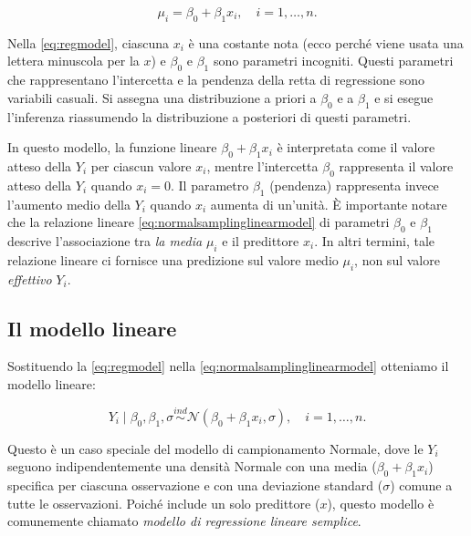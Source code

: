 \documentclass[
  11pt,
]{krantz}
\theoremstyle{definition}
\theoremstyle{definition}
\theoremstyle{definition}
\theoremstyle{definition}
\theoremstyle{remark}
\begin{document}
\begin{equation}
\mu_i = \beta_0 + \beta_ 1 x_i, \quad i = 1, \dots, n.
\label{eq:regmodel}
\end{equation}

Nella \eqref{eq:regmodel}, ciascuna \(x_i\) è una costante nota (ecco perché viene usata una lettera minuscola per la \(x\)) e \(\beta_0\) e \(\beta_ 1\) sono parametri incogniti. Questi parametri che rappresentano l'intercetta e la pendenza della retta di regressione sono variabili casuali. Si assegna una distribuzione a priori a \(\beta_0\) e a \(\beta_ 1\) e si esegue l'inferenza riassumendo la distribuzione a posteriori di questi parametri.

In questo modello, la funzione lineare \(\beta_0 + \beta_ 1 x_i\) è interpretata come il valore atteso della \(Y_i\) per ciascun valore \(x_i\), mentre l'intercetta \(\beta_0\) rappresenta il valore atteso della \(Y_i\) quando \(x_i = 0\). Il parametro \(\beta_ 1\) (pendenza) rappresenta invece l'aumento medio della \(Y_i\) quando \(x_i\) aumenta di un'unità. È importante notare che la relazione lineare \eqref{eq:normalsamplinglinearmodel} di parametri \(\beta_0\) e \(\beta_ 1\) descrive l'associazione tra \emph{la media} \(\mu_i\) e il predittore \(x_i\). In altri termini, tale relazione lineare ci fornisce una predizione sul valore medio \(\mu_i\), non sul valore \emph{effettivo} \(Y_i\).

\hypertarget{il-modello-lineare}{%
\subsection{Il modello lineare}\label{il-modello-lineare}}

Sostituendo la \eqref{eq:regmodel} nella \eqref{eq:normalsamplinglinearmodel} otteniamo il modello lineare:

\begin{equation}
Y_i \mid \beta_0, \beta_ 1, \sigma \stackrel{ind}{\sim} \mathcal{N}(\beta_0 + \beta_ 1 x_i, \sigma), \quad i = 1, \dots, n.
\label{eq:samplinglinearmodel}
\end{equation}

Questo è un caso speciale del modello di campionamento Normale, dove le \(Y_i\) seguono indipendentemente una densità Normale con una media (\(\beta_0 + \beta_ 1 x_i\)) specifica per ciascuna osservazione e con una deviazione standard (\(\sigma\)) comune a tutte le osservazioni. Poiché include un solo predittore (\(x\)), questo modello è comunemente chiamato \emph{modello di regressione lineare semplice}.
\end{document}
